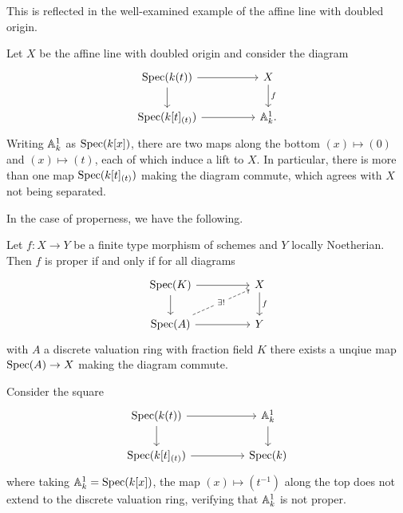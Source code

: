 This is reflected in the well-examined example of the affine line with doubled origin. 
\begin{example}
    Let $X$ be the affine line with doubled origin and consider the diagram 
    $$%
    \begin{tikzcd}
        {\spec(k(t))} && X \\
        {\spec(k[t]_{(t)})} && {\A^{1}_{k}.}
        \arrow[from=1-1, to=1-3]
        \arrow[from=1-1, to=2-1]
        \arrow["f", from=1-3, to=2-3]
        \arrow[from=2-1, to=2-3]
    \end{tikzcd}$$
    Writing $\mathbb{A}^{1}_{k}$ as $\operatorname{Spec}(k[x])$, there are two maps along the bottom $(x)\mapsto(0)$ and $(x)\mapsto(t)$, each of which induce a lift to $X$. In particular, there is more than one map $\operatorname{Spec}(k[t]_{(t)})$ making the diagram commute, which agrees with $X$ not being separated. 
\end{example}
In the case of properness, we have the following. 
\begin{theorem}\label{thm: valuative criterion for properness}
    Let $f:X\to Y$ be a finite type morphism of schemes and $Y$ locally Noetherian. Then $f$ is proper if and only if for all diagrams 
    $$%
    \begin{tikzcd}
        {\spec(K)} && X \\
        {\spec(A)} && Y
        \arrow[from=1-1, to=1-3]
        \arrow[from=1-1, to=2-1]
        \arrow["f", from=1-3, to=2-3]
        \arrow["{\exists!}"{description}, dashed, from=2-1, to=1-3]
        \arrow[from=2-1, to=2-3]
    \end{tikzcd}$$
    with $A$ a discrete valuation ring with fraction field $K$ there exists a unqiue map $\operatorname{Spec}(A)\to X$ making the diagram commute. 
\end{theorem}
\begin{example}
    Consider the square 
    $$%
    \begin{tikzcd}
        {\spec(k(t))} && {\A^{1}_{k}} \\
        {\spec(k[t]_{(t)})} && {\spec(k)}
        \arrow[from=1-1, to=1-3]
        \arrow[from=1-1, to=2-1]
        \arrow[from=1-3, to=2-3]
        \arrow[from=2-1, to=2-3]
    \end{tikzcd}$$
    where taking $\mathbb{A}^{1}_{k}=\operatorname{Spec}(k[x])$, the map $(x)\mapsto(t^{-1})$ along the top does not extend to the discrete valuation ring, verifying that $\mathbb{A}^{1}_{k}$ is not proper. 
\end{example}
